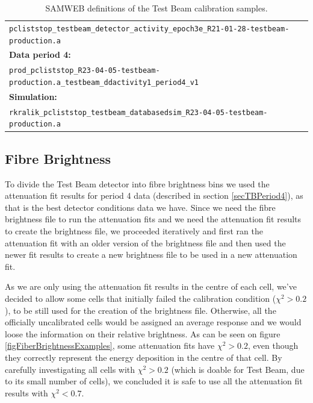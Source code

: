 \documentclass[12pt,a4paper]{article}
\begin{document}
\begin{table}[!ht]
\begin{tabular}{l}
\texttt{pcliststop\_testbeam\_detector\_activity\_epoch3e\_R21-01-28-testbeam-production.a}\\
\textbf{Data period 4:}\\
\texttt{prod\_pcliststop\_R23-04-05-testbeam-production.a\_testbeam\_ddactivity1\_period4\_v1}\\
\textbf{Simulation:}\\
\texttt{rkralik\_pcliststop\_testbeam\_databasedsim\_R23-04-05-testbeam-production.a}\\[5pt]
\hline\hline
\end{tabular}
\caption{SAMWEB definitions of the Test Beam calibration samples.}
\label{tabTBCalibrationDefinitions}
\end{table}

\subsection{Fibre Brightness}\label{secFibreBrightnessTB}

To divide the Test Beam detector into fibre brightness bins we used the attenuation fit results for period 4 data (described in section \ref{secTBPeriod4}), as that is the best detector conditions data we have. Since we need the fibre brightness file to run the attenuation fits and we need the attenuation fit results to create the brightness file, we proceeded iteratively and first ran the attenuation fit with an older version of the brightness file and then used the newer fit results to create a new brightness file to be used in a new attenuation fit.

As we are only using the attenuation fit results in the centre of each cell, we've decided to allow some cells that initially failed the calibration condition ($\chi^2>0.2$), to be still used for the creation of the brightness file. Otherwise, all the officially uncalibrated cells would be assigned an average response and we would loose the information on their relative brightness. As can be seen on figure \ref{figFiberBrightnessExamples}, some attenuation fits have $\chi^2>0.2$, even though they correctly represent the energy deposition in the centre of that cell. By carefully investigating all cells with $\chi^2>0.2$ (which is doable for Test Beam, due to its small number of cells), we concluded it is safe to use all the attenuation fit results with $\chi^2<0.7$.

\end{document}
